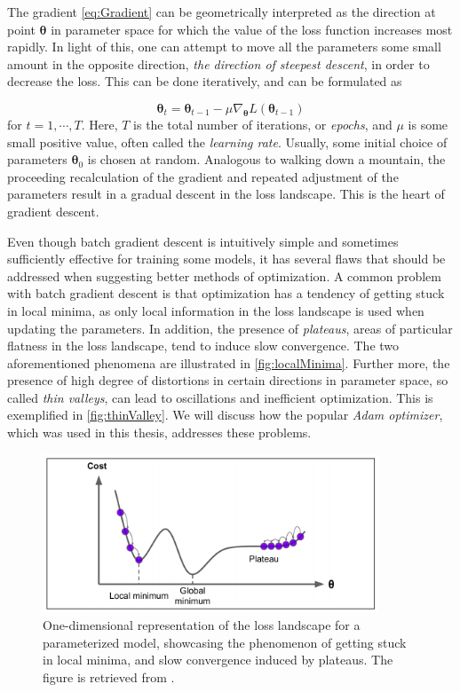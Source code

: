The gradient \autoref{eq:Gradient} can be geometrically interpreted as the direction at point $\boldsymbol{\theta}$ in parameter space for which the value of the loss function increases most rapidly. In light of this, one can attempt to move all the parameters some small amount in the opposite direction, \emph{the direction of steepest descent}, in order to decrease the loss. This can be done iteratively, and can be formulated as 


\begin{equation}\label{eq:ParameterUpdate}
    \boldsymbol{\theta}_{t} = \boldsymbol{\theta}_{t-1} - \mu \nabla_{\boldsymbol{\theta}} L(\boldsymbol{\theta}_{t-1})
\end{equation}
for $t=1, \cdots, T$. Here, $T$ is the total number of  iterations, or \emph{epochs}, and $\mu$ is some small positive value, often called the \emph{learning rate}. Usually, some initial choice of parameters $\boldsymbol{\theta}_{0}$ is chosen at random. Analogous to walking down a mountain, the proceeding recalculation of the gradient and repeated adjustment of the parameters result in a gradual descent in the loss landscape. This is the heart of gradient descent.

Even though batch gradient descent is intuitively simple and sometimes sufficiently effective for training some models, it has several flaws that should be addressed when suggesting better methods of optimization. A common problem with batch gradient descent is that optimization has a tendency of getting stuck in local minima, as only local information in the loss landscape is used when updating the parameters. In addition, the presence of \emph{plateaus}, areas of particular flatness in the loss landscape, tend to induce slow convergence. The two aforementioned phenomena are illustrated in \autoref{fig:localMinima}. Further more, the presence of high degree of distortions in certain directions in parameter space, so called  \emph{thin valleys}, can lead to oscillations and inefficient optimization. This is exemplified in \autoref{fig:thinValley}. We will discuss how the popular \emph{Adam optimizer}, which was used in this thesis, addresses these problems. 


\begin{figure}[htp]
    \centering
    \includegraphics[width=10cm]{latex/figures/local_minimum_saddle_point.png}
    \caption{One-dimensional representation of the loss landscape for a parameterized model, showcasing the phenomenon of getting stuck in local minima, and slow convergence induced by plateaus. The figure is retrieved from \citet{hands-on}.}
    \label{fig:localMinima}
\end{figure}


